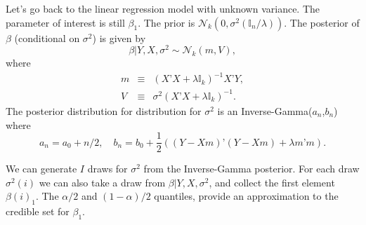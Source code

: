 \documentclass[11pt]{article} %
\begin{document}
 Let’s go back to the linear regression model with unknown variance. The parameter of interest is still $\beta_1$. The prior is $\mathcal{N}_{k}(0, \sigma^2 (\mathbb{I}_n/\lambda))$. The posterior of $\beta$ (conditional on $\sigma^2$) is given by
\[  \beta | Y, X, \sigma^2 \sim \mathcal{N}_{k} ( m , V   ),  \]
where 
\begin{eqnarray*}
m  &\equiv& (X’X + \lambda \mathbb{I}_k)^{-1} X’Y, \\
V  & \equiv & \sigma^2  (X’X + \lambda \mathbb{I}_k)^{-1}.
\end{eqnarray*}
The posterior distribution for distribution for $\sigma^2$ is an Inverse-Gamma($a_n$,$b_n$) where
\[ a_n = a_0 + n/2, \quad b_n = b_0 + \frac{1}{2}( (Y-Xm)’(Y-Xm) + \lambda m’m ). \]

We can generate $I$ draws for $\sigma^2$ from the Inverse-Gamma posterior. For each draw $\sigma^2(i)$ we can also take a draw from $\beta | Y,X, \sigma^2$, and collect the first element $\beta(i)_1$. The $\alpha/2$ and $(1-\alpha)/2$ quantiles, provide an approximation to the credible set for $\beta_1$. 

\newpage


\newpage




\end{document}
